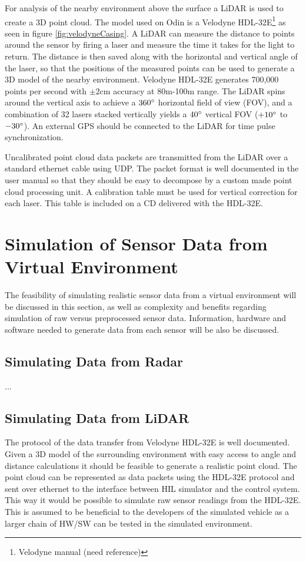 For analysis of the nearby environment above the surface a LiDAR is used to create a 3D point cloud. The model used on Odin is a Velodyne HDL-32E\footnote{Velodyne manual (need reference)} as seen in figure \ref{fig:velodyneCasing}. A LiDAR can measure the distance to points around the sensor by firing a laser and measure the time it takes for the light to return. The distance is then saved along with the horizontal and vertical angle of the laser, so that the positions of the measured points can be used to generate a 3D model of the nearby environment. Velodyne HDL-32E generates 700,000 points per second with $\pm2$cm accuracy at 80m-100m range. The LiDAR spins around the vertical axis to achieve a $360\degree$ horizontal field of view (FOV), and a combination of 32 lasers stacked vertically yields a $40\degree$ vertical FOV ($+10\degree$ to $-30\degree$). An external GPS should be connected to the LiDAR for time pulse synchronization.

Uncalibrated point cloud data packets are transmitted from the LiDAR over a standard ethernet cable using UDP. The packet format is well documented in the user manual so that they should be easy to decompose by a custom made point cloud processing unit. A calibration table must be used for vertical correction for each laser. This table is included on a CD delivered with the HDL-32E.
 


\section{Simulation of Sensor Data from Virtual Environment}
The feasibility of simulating realistic sensor data from a virtual environment will be discussed in this section, as well as complexity and benefits regarding simulation of raw versus preprocessed sensor data. Information, hardware and software needed to generate data from each sensor will be also be discussed.

\subsection{Simulating Data from Radar}
...

\subsection{Simulating Data from LiDAR}
The protocol of the data transfer from Velodyne HDL-32E is well documented. Given a 3D model of the surrounding environment with easy access to angle and distance calculations it should be feasible to generate a realistic point cloud. The point cloud can be represented as data packets using the HDL-32E protocol and sent over ethernet to the interface between HIL simulator and the control system. This way it would be possible to simulate raw sensor readings from the HDL-32E. This is assumed to be beneficial to the developers of the simulated vehicle as a larger chain of HW/SW can be tested in the simulated environment.

